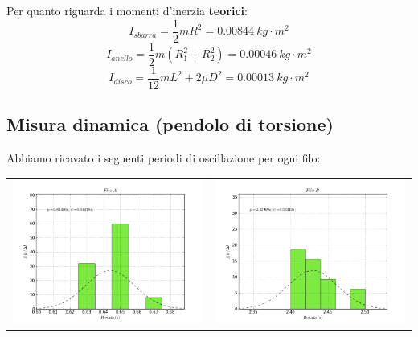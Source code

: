 Per quanto riguarda i momenti d'inerzia \textbf{teorici}:
$$ I_{sbarra} = \frac{1}{2} m R^2 = 0.00844\ kg\cdot m^2$$
$$ I_{anello} =\frac{1}{2} m (R^2_1 + R^2_2) = 0.00046\ kg\cdot m^2$$
$$ I_{disco} = \frac{1}{12} m L^2 + 2 \mu D^2 = 0.00013\ kg\cdot m^2$$



\subsection{Misura dinamica (pendolo di torsione)}

Abbiamo ricavato i seguenti periodi di oscillazione per ogni filo:
\\
\begin{tabular}{cc}
\includegraphics[scale=0.4]{../grafici/FiloA.png}
&
\includegraphics[scale=0.4]{../grafici/FiloB.png}

\end{tabular}
